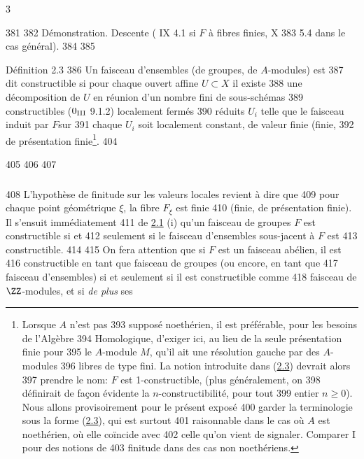 3	\documentclass[10pt]{../fichiers-configuration-latex/smfart}
\begin{document}
   381	
   382	Démonstration. Descente ( IX 4.1 si $F$ à fibres finies,  X
   383	5.4 dans le cas général).
   384	
   385	\begin{enonce*}{Définition 2.3}
   386	Un faisceau d'ensembles (\resp de groupes, \resp de $A$-modules) est
   387	dit constructible si pour chaque ouvert affine $U\subset X$ il existe
   388	une décomposition de $U$ en réunion d'un nombre fini de sous-schémas
   389	constructibles {\rm (\EGA $0_{{\rm III}}$ 9.1.2)} localement fermés
   390	réduits $U_i$ telle que le faisceau induit par $F$\pageoriginale sur
   391	chaque $U_i$ soit localement constant, de valeur finie (\resp finie,
   392	\resp de présentation finie\footnote[1]{Lorsque $A$ n'est pas
   393	  supposé noethérien, il est préférable, pour les besoins de l'Algèbre
   394	Homologique, d'exiger ici, au lieu de la seule présentation finie pour
   395	le $A$-module $M$, qu'il ait une résolution gauche par des $A$-modules
   396	libres de type fini. La notion introduite dans (\hyperref[IX.def2.3]{2.3}) devrait alors
   397	prendre le nom: $F$ est 1-constructible, (plus généralement, on
   398	définirait de façon évidente la $n$-constructibilité, pour tout
   399	entier $n\geq 0$). Nous allons provisoirement pour le présent exposé
   400	garder la terminologie sous la forme (\hyperref[IX.def2.3]{2.3}), qui est surtout
   401	raisonnable dans le cas où $A$ est noethérien, où elle coïncide avec
   402	celle qu'on vient de signaler. Comparer  I pour des notions de
   403	finitude dans des cas non noethériens.}.
   404	\end{enonce*}
   405	
   406	\setcounter{subsection}{3}
   407	\subsubsection{}
   408	L'hypothèse de finitude sur les valeurs locales revient à dire que
   409	pour chaque point géométrique $\xi$, la fibre $F_{\xi}$ est finie
   410	(\resp finie, \resp de présentation finie). Il s'ensuit immédiatement
   411	de \hyperref[IX.lem2.1]{2.1} (i) qu'un faisceau de groupes $F$ est constructible si et
   412	seulement si le faisceau d'ensembles sous-jacent à $F$ est
   413	constructible.
   414	
   415	On fera attention que si $F$ est un faisceau abélien, il est
   416	constructible en tant que faisceau de groupes (ou encore, en tant que
   417	faisceau d'ensembles) si et seulement si il est constructible comme
   418	faisceau de $\ZZ$-modules, et si \emph{de plus} ses
\end{document}
